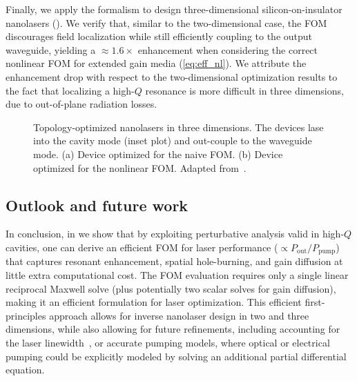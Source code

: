 Finally, we apply the formalism to design three-dimensional silicon-on-insulator nanolasers (). 
We verify that, similar to the two-dimensional case, the FOM discourages field localization while still efficiently coupling to the output waveguide, yielding a $\approx 1.6\times$
enhancement when considering the correct nonlinear FOM for extended gain media (\eqref{eq:eff_nl}). We attribute the enhancement drop with respect to the two-dimensional optimization results to the fact that localizing a high-$Q$ resonance is more difficult in three dimensions, due to out-of-plane radiation losses.

\begin{figure}[tb]
    \centering
    \caption{Topology-optimized nanolasers in three dimensions. The devices lase into the cavity mode (inset plot) and out-couple to the waveguide mode. (a) Device optimized for the naive FOM. (b) Device optimized for the nonlinear FOM.
    Adapted from~\cite{ownpub4}.}
    \label{fig:laser3d}
\end{figure}

\subsection*{Outlook and future work}

In conclusion, in \cite{ownpub4} we show that by exploiting perturbative analysis valid in high-$Q$ cavities, one can derive  
an efficient FOM for laser performance ($\propto P_\text{out}/P_\text{pump}$) that captures resonant enhancement,  
spatial hole-burning, and gain diffusion at little extra computational cost. The FOM evaluation requires only a  
single linear reciprocal Maxwell solve (plus potentially two scalar solves for gain diffusion), making it 
an efficient formulation for laser optimization. This efficient first-principles approach allows for inverse nanolaser design in two and three dimensions, while  
also allowing for future refinements, including accounting for the laser linewidth~\cite{pick}, or accurate pumping models, where optical or electrical pumping could be explicitly
modeled by solving an additional partial differential equation.
